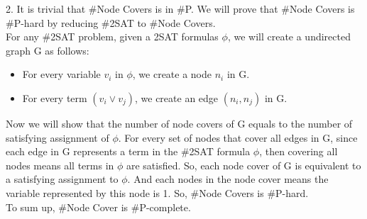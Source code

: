 \documentclass[12pt]{article}
\begin{document}
2. It is trivial that \#Node Covers is in \#P. We will prove that
\#Node Covers is \#P-hard by reducing \#2SAT to \#Node Covers. \\

For any \#2SAT problem, given a 2SAT formulas $\phi$, we will create
a undirected graph G as follows:

\begin{itemize}
\item For every variable $v_i$ in $\phi$, we create a node $n_i$ in G.
\item For every term $(v_i \lor v_j)$, we create an edge $(n_i, n_j)$
  in G.
\end{itemize}

Now we will show that the number of node covers of G equals to the
number of satisfying assignment of $\phi$. For every set of nodes that
cover all edges in G, since each edge in G represents a term in the
\#2SAT formula $\phi$, then covering all nodes means all terms in
$\phi$ are satisfied. So, each node cover of G is equivalent to a
satisfying assignment to $\phi$. And each nodes in the node cover
means the variable represented by this node is 1. So, \#Node Covers is
\#P-hard. \\

To sum up, \#Node Cover is \#P-complete.
\end{document}
